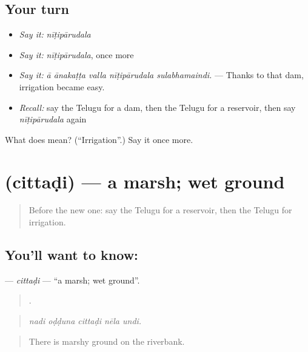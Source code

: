 \subsection*{Your turn}
\begin{itemize}
\raggedright
  \item \emph{Say it:} \emph{nīṭipārudala}
  \item \emph{Say it:} \emph{nīṭipārudala}, once more
  \item \emph{Say it:} \emph{ā ānakaṭṭa valla nīṭipārudala sulabhamaindi.} — Thanks to that dam, irrigation became easy.
  \item \emph{Recall:} say the Telugu for a dam, then the Telugu for a reservoir, then say \emph{nīṭipārudala} again
\end{itemize}

\begin{tcolorbox}[breakable,colback=teal!4,colframe=teal!35!black,title={Before you move on}]
What does  mean? (\textquotedblleft{}Irrigation\textquotedblright{}.) Say it once more.
\end{tcolorbox}
\section[\texorpdfstring{\te{చిత్తడి} (cittaḍi)}{చిత్తడి (cittaḍi)}]{ (cittaḍi) — a marsh; wet ground}

\label{lesson:TE-C475-cittadi}



\begin{quote}
Before the new one: say the Telugu for a reservoir, then the Telugu for irrigation.
\end{quote}

\subsection*{You'll want to know: }
\textbf{} — \emph{cittaḍi} — \textquotedblleft{}a marsh; wet ground\textquotedblright{}.

\begin{quote}
    .
\end{quote}

\begin{quote}
\emph{nadi oḍḍuna cittaḍi nēla undi.}
\end{quote}

\begin{quote}
There is marshy ground on the riverbank.
\end{quote}

